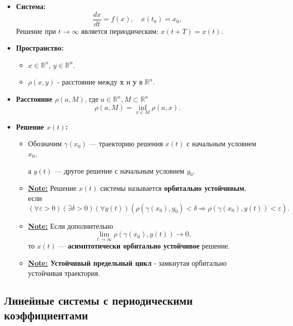 	\begin{itemize}[leftmargin=1em]
		\item \textbf{Система:}
		\begin{equation}
			\frac{d x}{d t} = f(x), \quad x(t_0) = x_0,
		\end{equation}
		Решение при \(t \to \infty\) является периодическим: \(x(t + T) = x(t)\).
		\item \textbf{Пространство:}
		\begin{itemize}
			\item \(x \in \mathbb{R}^n\), \(y \in \mathbb{R}^n\).
			\item \(\rho(x, y)\) - расстояние между \textbf{x} и \textbf{y} в \( \mathbb{R}^n \).
		\end{itemize}
		\item \textbf{Расстояние \(\rho(a, M)\)}, где \( a \in \mathbb{R}^n, M \subset \mathbb{R}^n \)
		\begin{equation}
			\rho(a, M) = \inf_{x \in M} \rho(a, x).
		\end{equation}
		\item \textbf{Решение \(x(t)\):}
		\begin{itemize}
			\item Обозначим \( \gamma(x_0) \) — траекторию решения \( x(t) \) с начальным условием \( x_0 \), 
			\par 
			а \( y(t) \) — другое решение с начальным условием \( y_0 \).
			\item \textbf{\uline{Note:}} Решение \( x(t) \) системы  называется \textbf{орбитально устойчивым}, если
			\begin{equation}
				(\forall \varepsilon > 0)(\exists \delta > 0)(\forall y(t)) \left( \rho(\gamma(x_0), y_0) < \delta \Rightarrow \rho(\gamma(x_0), y(t)) < \varepsilon \right).
			\end{equation}
			\item \textbf{\uline{Note:}} Если дополнительно
			\begin{equation}
				\lim_{t \to \infty} \rho(\gamma(x_0), y(t)) \to 0,
			\end{equation}
			то \( x(t) \) — \textbf{асимптотически орбитально устойчивое} решение.
			\item \textbf{\uline{Note:} Устойчивый предельный цикл} - замкнутая орбитально устойчивая траектория. 
		\end{itemize}
	\end{itemize}
	
	\subsection{Линейные системы с периодическими коэффициентами}
	
